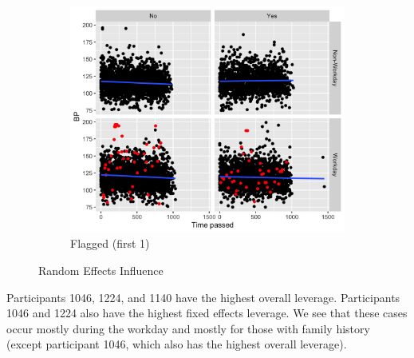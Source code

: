 \documentclass[12pt,twoside,letterpaper]{article}
\theoremstyle{definition}
\theoremstyle{definition}
\begin{document}
\begin{figure}[H]
\begin{subfigure}[b]{0.36\textwidth}
        \centering
        \includegraphics[width=\textwidth]{pics/rvc stand flagged.png}
        \caption[]%
        {{\small Flagged (first 1) }}
        \label{fig: rvc slope flagged}
        \end{subfigure}
    \caption[]
    {\small Random Effects Influence}
    \label{fig: rvc and flagged}
    \end{figure}

Participants 1046, 1224, and 1140 have the highest overall leverage. Participants 1046 and 1224 also have the highest fixed effects leverage. We see that these cases occur mostly during the workday and mostly for those with family history (except participant 1046, which also has the highest overall leverage). 
\end{document}
